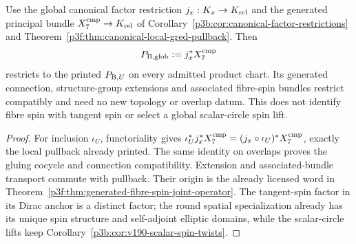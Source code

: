 \documentclass[12pt,a4paper]{article}
\begin{document}
\begin{proposition}
\label{p10:prop:v2189-canonical-global-bundle}
Use the global canonical factor restriction $j_x:K_x\to K_{\rm rel}$
and the generated principal bundle $X_7^{\rm cmp}\to K_{\rm rel}$ of
Corollary~\ref{p3b:cor:canonical-factor-restrictions} and
Theorem~\ref{p3f:thm:canonical-local-gred-pullback}. Then
\[
 P_{{\rm B},\rm glob}:=j_x^*X_7^{\rm cmp}
\]
restricts to the printed $P_{{\rm B},U}$ on every admitted product chart.
Its generated connection, structure-group extensions and associated
fibre-spin bundles restrict compatibly and need no new topology or overlap
datum. This does not identify fibre spin with tangent spin or select a
global scalar-circle spin lift.
\end{proposition}
\begin{proof}
For inclusion $\iota_U$, functoriality gives
$\iota_U^*j_x^*X_7^{\rm cmp}=(j_x\circ\iota_U)^*X_7^{\rm cmp}$,
exactly the local pullback already printed. The same identity on overlaps
proves the gluing cocycle and connection compatibility. Extension and
associated-bundle transport commute with pullback. Their origin is the
already licensed word in
Theorem~\ref{p3f:thm:generated-fibre-spin-joint-operator}.
The tangent-spin factor in its Dirac anchor is a distinct factor; the
round spatial specialization already has its unique spin structure and
self-adjoint elliptic domains, while the scalar-circle lifts keep
Corollary~\ref{p3b:cor:v190-scalar-spin-twists}.
\end{proof}
\end{document}
